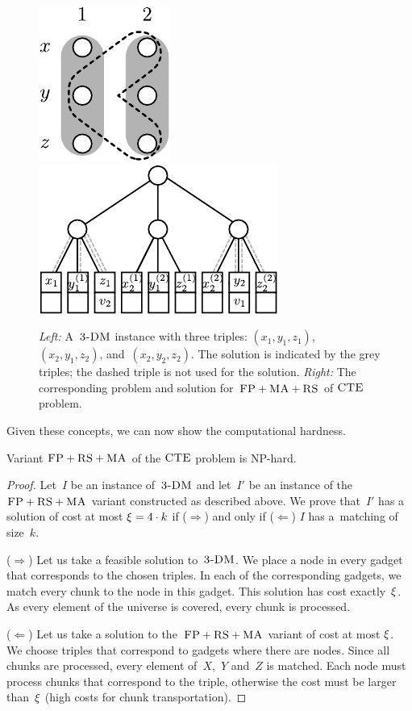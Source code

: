 \begin{figure}[t]
\hfill
\includegraphics[width = 0.3\columnwidth]{figs/static-mapping/np_3dm_formular}
\hfill
\includegraphics[width = 0.5\columnwidth]{figs/static-mapping/np_3dm_construction}
\caption{\textit{Left:} A~$\textsc{3-DM}$ instance with three triples:
$(x_1, y_1, z_1)$,~$(x_2, y_1, z_2)$, and~$(x_2, y_2, z_2)$. The solution is
indicated by the grey triples; the dashed triple is not used for the
solution. \textit{Right:} The corresponding problem and solution for~$\textsc{FP} + \textsc{MA}
+ \textsc{RS}$ of $\textsc{CTE}$ problem.}
\hfill
\label{fig:fprsma}
\end{figure}


Given these concepts, we can now show the computational hardness.
\begin{theorem}
  Variant $\textsc{FP}+\textsc{RS}+\textsc{MA}$ of the $\textsc{CTE}$ problem is NP-hard.
  \label{th:ma-unlimited}
\end{theorem}
\begin{proof}
Let~$I$ be an instance of~$\textsc{3-DM}$ and let~$I'$ be an instance of
the~$\textsc{FP}+\textsc{RS}+\textsc{MA}$ variant constructed as described above. We prove that~$I'$ has a solution of cost at most $\xi = 4 \cdot k$ if ($\Rightarrow$) and only if
($\Leftarrow$)
$I$ has a~matching of size~$k$.

($\Rightarrow$) Let us take a feasible solution to~$\textsc{3-DM}$. We place a node in every
gadget that corresponds to the chosen triples. In each of the corresponding
gadgets, we match every chunk to the node in this gadget. This
solution has
cost exactly~$\xi$. As every element of the universe is covered, every
chunk is processed.

($\Leftarrow$) Let us take a solution to the~$\textsc{FP}+\textsc{RS}+\textsc{MA}$ variant of cost at most $\xi$. We
choose triples that correspond to gadgets where there are nodes. Since
all chunks are processed, every element of~$X$,~$Y$ and~$Z$ is matched. Each
node must process chunks that
correspond to the triple, otherwise the
cost must be larger than~$\xi$ (high costs for chunk
transportation).
\end{proof}

